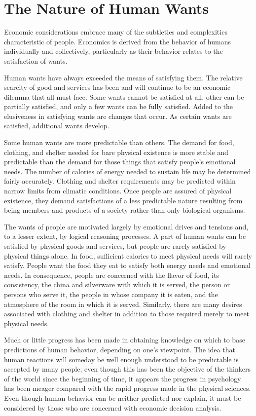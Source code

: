 \section{The Nature of Human Wants}

Economic considerations embrace many of the subtleties and complexities characteristic of people. Economics is derived from the behavior of humans individually and collectively, particularly as their behavior relates to the satisfaction of wants.

Human wants have always exceeded the means of satisfying them. The relative scarcity of good and services has been and will continue to be an economic dilemma that all must face. Some wants cannot be satisfied at all, other can be partially satisfied, and only a few wants can be fully satisfied. Added to the elusiveness in satisfying wants are changes that occur.  As certain wants are satisfied, additional wants develop.

Some human wants are more predictable than others. The demand for food, clothing, and shelter needed for bare physical existence is more stable and predictable than the demand for those things that satisfy people’s emotional needs. The number of calories of energy needed to sustain life may be determined fairly accurately. Clothing and shelter requirements may be predicted within narrow limits from climatic conditions. Once people are assured of physical existence, they demand satisfactions of a less predictable nature resulting from being members and products of a society rather than only biological organisms.

The wants of people are motivated largely by emotional drives and tensions and, to a lesser extent, by logical reasoning processes. A part of human wants can be satisfied by physical goods and services, but people are rarely satisfied by physical things alone. In food, sufficient calories to meet physical needs will rarely satisfy. People want the food they eat to satisfy both energy needs and emotional needs. In consequence, people are concerned with the flavor of food, its consistency, the china and silverware with which it is served, the person or persons who serve it, the people in whose company it is eaten, and the atmosphere of the room in which it is served. Similarly, there are many desires associated with clothing and shelter in addition to those required merely to meet physical needs.

Much or little progress has been made in obtaining knowledge on which to base predictions of human behavior, depending on one’s viewpoint. The idea that human reactions will someday be well enough understood to be predictable is accepted by many people; even though this has been the objective of the thinkers of the world since the beginning of time, it appears the progress in psychology has been meager compared with the rapid progress made in the physical sciences. Even though human behavior can be neither predicted nor explain, it must be considered by those who are concerned with economic decision analysis.

